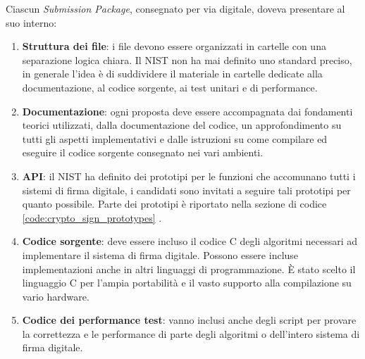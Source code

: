 Ciascun \textit{Submission Package}, consegnato per via digitale, doveva presentare al suo interno:
\begin{enumerate}
    \item \textbf{Struttura dei file}: i file devono essere organizzati in cartelle con una separazione logica chiara. Il NIST non ha mai definito uno standard preciso, in generale l'idea è di suddividere il materiale in cartelle dedicate alla documentazione, al codice sorgente, ai test unitari e di performance.
    \item \textbf{Documentazione}: ogni proposta deve essere accompagnata dai fondamenti teorici utilizzati, dalla documentazione del codice, un approfondimento su tutti gli aspetti implementativi e dalle istruzioni su come compilare ed eseguire il codice sorgente consegnato nei vari ambienti.
    \item \textbf{API}: il NIST ha definito dei prototipi per le funzioni che accomunano tutti i sistemi di firma digitale, i candidati sono invitati a seguire tali prototipi per quanto possibile. Parte dei prototipi è riportato nella sezione di codice \ref{code:crypto_sign_prototypes} \cite{nist-pqc-api}.
    \item \textbf{Codice sorgente}: deve essere incluso il codice C degli algoritmi necessari ad implementare il sistema di firma digitale. Possono essere incluse implementazioni anche in altri linguaggi di programmazione. È stato scelto il linguaggio C per l'ampia portabilità e il vasto supporto alla compilazione su vario hardware.
    \item \textbf{Codice dei performance test}: vanno inclusi anche degli script per provare la correttezza e le performance di parte degli algoritmi o dell'intero sistema di firma digitale.
\end{enumerate}

